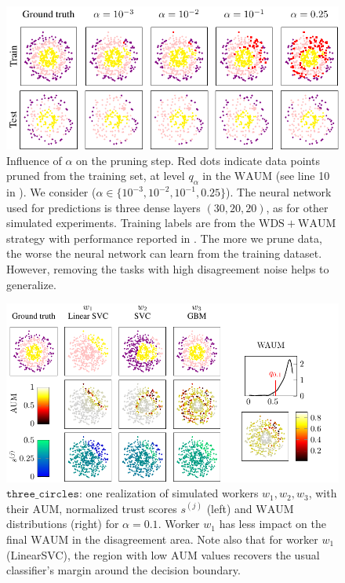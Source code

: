\begin{figure}[tbh]
    \centering
    \includegraphics[width=.75\linewidth]{images/Simu3circlesAlpha.pdf}
    \caption{Influence of $\alpha$ on the pruning step. Red dots indicate data points pruned from the training set, at level $q_\alpha$ in the $\mathrm{WAUM}$ (see line 10 in ).
        We consider ($\alpha\in\{10^{-3}, 10^{-2}, 10^{-1}, 0.25\}$).
        The neural network used for predictions is three dense layers
        $(30, 20, 20)$, as for other simulated experiments.
        Training labels are from the $\mathrm{WDS+WAUM}$ strategy with performance reported in .
        The more we prune data, the worse the neural network can learn from the training dataset.
        However, removing the tasks with high disagreement noise helps to generalize.
        }    \label{fig:three_circles_alpha_influence}
\end{figure}

\begin{figure}[thb]
    \centering
    \includegraphics[width=.75\linewidth]{images/Simu3circles}
    \caption{$\texttt{three\_circles}$: one realization of simulated workers $w_1,w_2,w_3$, with their $\mathrm{AUM}$, normalized trust scores $s^{(j)}$ (left) and $\mathrm{WAUM}$ distributions (right) for $\alpha=0.1$. Worker $w_1$ has less impact on the final $\mathrm{WAUM}$ in the disagreement area. Note also that for worker $w_1$ (LinearSVC), the region with low $\mathrm{AUM}$ values recovers the usual classifier's margin around the decision boundary.}
    \label{fig:threecircles_workers}
\end{figure}


